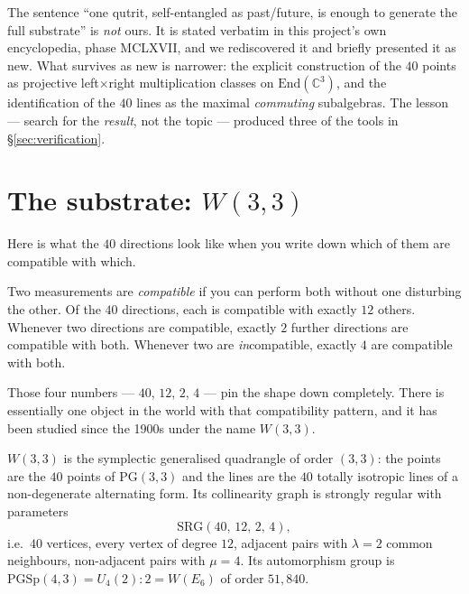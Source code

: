 \begin{gotwrong}
The sentence ``one qutrit, self-entangled as past/future, is enough to generate the full
substrate'' is \emph{not} ours. It is stated verbatim in this project's own
encyclopedia,  phase MCLXVII, and we rediscovered it and briefly
presented it as new. What survives as new is narrower: the explicit construction of the
$40$ points as projective left$\times$right multiplication classes on
$\mathrm{End}(\mathbb{C}^3)$, and the identification of the $40$ lines as the maximal
\emph{commuting} subalgebras. The lesson --- search for the \emph{result}, not the topic
--- produced three of the tools in \S\ref{sec:verification}.
\end{gotwrong}

\section{The substrate: $W(3,3)$}\label{sec:geometry}

\begin{plain}
Here is what the $40$ directions look like when you write down which of them are
compatible with which.

Two measurements are \emph{compatible} if you can perform both without one disturbing
the other. Of the $40$ directions, each is compatible with exactly $12$ others. Whenever
two directions are compatible, exactly $2$ further directions are compatible with both.
Whenever two are \emph{in}compatible, exactly $4$ are compatible with both.

Those four numbers --- $40$, $12$, $2$, $4$ --- pin the shape down completely. There is
essentially one object in the world with that compatibility pattern, and it has been
studied since the 1900s under the name $W(3,3)$.
\end{plain}

\begin{spec}
$W(3,3)$ is the symplectic generalised quadrangle of order $(3,3)$: the points are the
$40$ points of $\mathrm{PG}(3,3)$ and the lines are the $40$ totally isotropic lines of a
non-degenerate alternating form. Its collinearity graph is strongly regular with
parameters
\[
  \mathrm{SRG}(40,\,12,\,2,\,4),
\]
i.e.\ $40$ vertices, every vertex of degree $12$, adjacent pairs with $\lambda=2$ common
neighbours, non-adjacent pairs with $\mu=4$. Its automorphism group is
$\mathrm{PGSp}(4,3)=U_4(2){:}2=W(E_6)$ of order $51{,}840$.
\end{spec}

